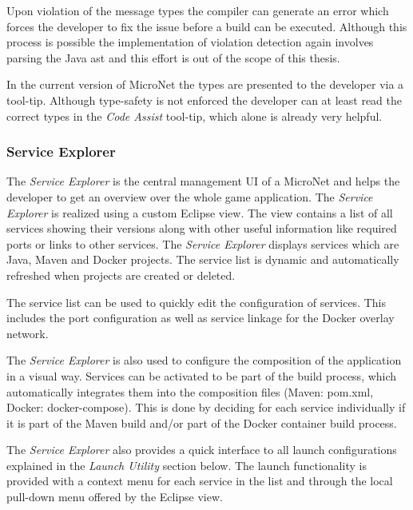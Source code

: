 Upon violation of the message types the compiler can generate an error which
forces the developer to fix the issue before a build can be executed.
Although this process is possible the implementation of violation detection
again involves parsing the Java \gls{ast} and this effort is out of the scope of
this thesis.

In the current version of MicroNet the types are presented to the developer via
a tool-tip. Although type-safety is not enforced the developer can at least read
the correct types in the \textit{Code Assist} tool-tip, which alone is already very
helpful.


\subsubsection{Service Explorer}

The \textit{Service Explorer} is the central management UI of a MicroNet and
helps the developer to get an overview over the whole game application. The
\textit{Service Explorer} is realized using a custom Eclipse view. The view
contains a list of all services showing their versions along with other useful
information like required ports or links to other services. The \textit{Service
Explorer} displays services which are Java, Maven and Docker projects. The
service list is dynamic and automatically refreshed when projects are created or
deleted.

The service list can be used to quickly edit the configuration of services. This
includes the port configuration as well as service linkage for the Docker
overlay network.

The \textit{Service Explorer} is also used to configure the composition of the
application in a visual way. Services can be activated to be part of the build
process, which automatically integrates them into the composition files (Maven:
pom.xml, Docker: docker-compose). This is done by deciding for each service
individually if it is part of the Maven build and/or part of the Docker
container build process.

The \textit{Service Explorer} also provides a quick interface to all launch
configurations explained in the \textit{Launch Utility} section below. The launch
functionality is provided with a context menu for each service in the list and
through the local pull-down menu offered by the Eclipse view.


